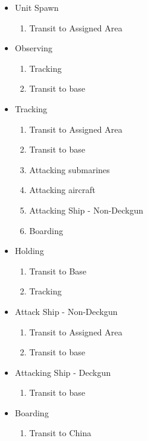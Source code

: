 \documentclass{article}
\begin{document}
\begin{itemize}
    \item Unit Spawn
        \begin{enumerate}[label=\arabic*)]
            \item Transit to Assigned Area
        \end{enumerate}
    \item Observing
        \begin{enumerate}[label=\arabic*)]
            \item Tracking
            \item Transit to base
        \end{enumerate}
    \item Tracking
        \begin{enumerate}[label=\arabic*)]
            \item Transit to Assigned Area
            \item Transit to base
            \item Attacking submarines
            \item Attacking aircraft
            \item Attacking Ship - Non-Deckgun
            \item Boarding
        \end{enumerate}
    \item Holding
        \begin{enumerate}[label=\arabic*)]
            \item Transit to Base
            \item Tracking
        \end{enumerate}
    \item Attack Ship - Non-Deckgun
        \begin{enumerate}[label=\arabic*)]
            \item Transit to Assigned Area
            \item Transit to base
        \end{enumerate}
    \item Attacking Ship - Deckgun
        \begin{enumerate}[label=\arabic*)]
            \item Transit to base
        \end{enumerate} 
    \item Boarding
        \begin{enumerate}[label=\arabic*)]
            \item Transit to China

\end{enumerate}
\end{itemize}
\end{document}
